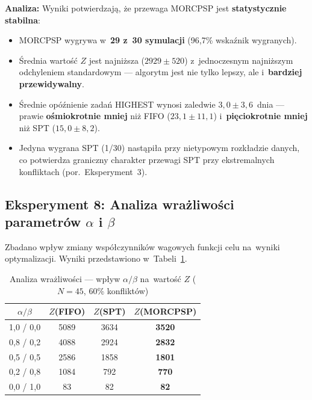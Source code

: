 \textbf{Analiza:} Wyniki potwierdzają, że przewaga MORCPSP jest \textbf{statystycznie stabilna}:
\begin{itemize}
    \item MORCPSP wygrywa w~\textbf{29 z~30 symulacji} (96{,}7\% wskaźnik wygranych).
    \item Średnia wartość $Z$ jest najniższa ($2929 \pm 520$) z~jednoczesnym najniższym odchyleniem standardowym --- algorytm jest nie tylko lepszy, ale i~\textbf{bardziej przewidywalny}.
    \item Średnie opóźnienie zadań HIGHEST wynosi zaledwie $3{,}0 \pm 3{,}6$~dnia --- prawie \textbf{ośmiokrotnie mniej} niż FIFO ($23{,}1 \pm 11{,}1$) i~\textbf{pięciokrotnie mniej} niż SPT ($15{,}0 \pm 8{,}2$).
    \item Jedyna wygrana SPT (1/30) nastąpiła przy nietypowym rozkładzie danych, co potwierdza graniczny charakter przewagi SPT przy ekstremalnych konfliktach (por.~Eksperyment~3).
\end{itemize}

\subsection{Eksperyment 8: Analiza wrażliwości parametrów $\alpha$ i $\beta$}

Zbadano wpływ zmiany współczynników wagowych funkcji celu na~wyniki optymalizacji. Wyniki przedstawiono w~Tabeli~\ref{tab:exp8_sensitivity}.

\begin{table}[H]
\centering
\caption{Analiza wrażliwości --- wpływ $\alpha/\beta$ na~wartość $Z$ ($N=45$, 60\% konfliktów)}
\label{tab:exp8_sensitivity}
\begin{tabular}{|c|c|c|c|}
\hline
$\alpha / \beta$ & $Z$\textbf{(FIFO)} & $Z$\textbf{(SPT)} & $Z$\textbf{(MORCPSP)} \\ \hline
1{,}0 / 0{,}0 & 5089 & 3634 & \textbf{3520} \\ \hline
0{,}8 / 0{,}2 & 4088 & 2924 & \textbf{2832} \\ \hline
0{,}5 / 0{,}5 & 2586 & 1858 & \textbf{1801} \\ \hline
0{,}2 / 0{,}8 & 1084 & 792 & \textbf{770} \\ \hline
0{,}0 / 1{,}0 & 83 & 82 & \textbf{82} \\ \hline
\end{tabular}
\end{table}

